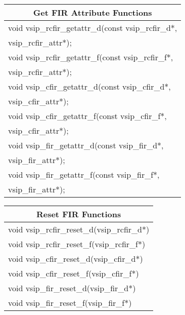 \clearpage
\hspace*{1.cm} {
\ttfamily
\begin{tabular}[H]{|l|}
\multicolumn{1}{c}{\rmfamily \bfseries Get FIR Attribute Functions\vspace{.1cm}}\\ \hline
void vsip\_rcfir\_getattr\_d(const vsip\_rcfir\_d*,\\*\hspace{.7cm}vsip\_rcfir\_attr*);\\
void vsip\_rcfir\_getattr\_f(const vsip\_rcfir\_f*,\\*\hspace{.7cm}vsip\_rcfir\_attr*);\\
void vsip\_cfir\_getattr\_d(const vsip\_cfir\_d*,\\*\hspace{.7cm}vsip\_cfir\_attr*);\\
void vsip\_cfir\_getattr\_f(const vsip\_cfir\_f*,\\*\hspace{.7cm}vsip\_cfir\_attr*);\\
void vsip\_fir\_getattr\_d(const vsip\_fir\_d*,\\*\hspace{.7cm}vsip\_fir\_attr*);\\
void vsip\_fir\_getattr\_f(const vsip\_fir\_f*,\\*\hspace{.7cm}vsip\_fir\_attr*);\\\hline
\end{tabular}\vspace{.1cm}
}\vspace{.1cm}
\newline \hspace*{1.cm} {
\ttfamily
\begin{tabular}[H]{|l|}
\multicolumn{1}{c}{\rmfamily \bfseries Reset FIR Functions\vspace{.1cm}}\\ \hline
void vsip\_rcfir\_reset\_d(vsip\_rcfir\_d*)\\
void vsip\_rcfir\_reset\_f(vsip\_rcfir\_f*)\\
void vsip\_cfir\_reset\_d(vsip\_cfir\_d*)\\
void vsip\_cfir\_reset\_f(vsip\_cfir\_f*)\\
void vsip\_fir\_reset\_d(vsip\_fir\_d*)\\
void vsip\_fir\_reset\_f(vsip\_fir\_f*)\\\hline
\end{tabular}\\
}
